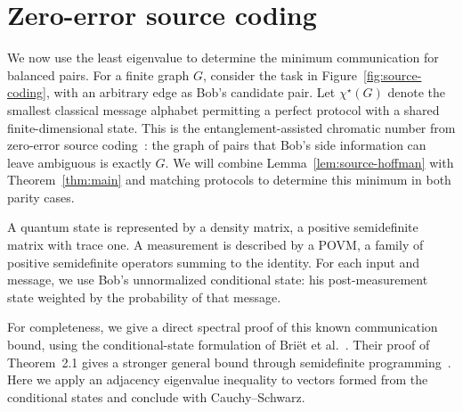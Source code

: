 \documentclass[11pt,a4paper]{article}
\numberwithin{equation}{section}
\numberwithin{figure}{section}
\numberwithin{table}{section}
\numberwithin{footnote}{section}
\theoremstyle{informal}\newtheorem*{informaltheorem}{Informal theorem}
\theoremstyle{definition}\newtheorem{example}{Example}[section]
\theoremstyle{remark}\newtheorem{remark}[theorem]{Remark}
\newcommand{\chs}{\chi^{\star}}
\begin{document}
\section{Zero-error source coding}\label{sec:source-coding}
We now use the least eigenvalue to determine the minimum
communication for balanced pairs.
For a finite graph \(G\), consider the task in
Figure~\ref{fig:source-coding}, with an arbitrary edge as Bob's
candidate pair. Let \(\chs(G)\) denote the smallest classical
message alphabet permitting a perfect protocol with a shared
finite-dimensional state. This is the entanglement-assisted chromatic
number from zero-error source coding~\cite{bblps}: the graph of pairs
that Bob's side information can leave ambiguous is exactly \(G\).
We will combine Lemma~\ref{lem:source-hoffman} with
Theorem~\ref{thm:main} and matching protocols to
determine this minimum in both parity cases.

A quantum state is represented by a density matrix, a positive
semidefinite matrix with trace one. A measurement is described by
a POVM, a family of positive semidefinite operators summing to the
identity. For each input and message, we use Bob's unnormalized
conditional state: his post-measurement state weighted by the
probability of that message.

For completeness, we give a direct spectral proof of this known
communication bound, using the conditional-state formulation of
Bri\"et et al.~\cite[Sec.~1.2]{bblps}.
Their proof of Theorem~2.1 gives a stronger general bound through
semidefinite programming~\cite[Sec.~4]{bblps}.
Here we apply an adjacency eigenvalue inequality to vectors formed
from the conditional states and conclude with Cauchy--Schwarz.
\end{document}
